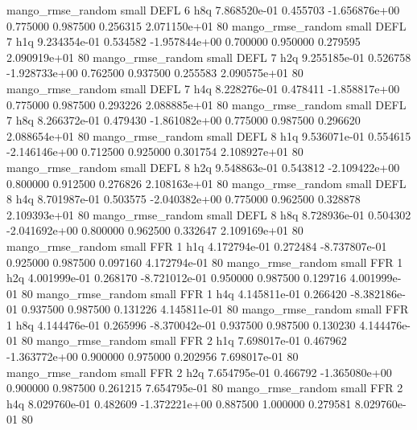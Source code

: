 mango_rmse_random      small     DEFL                 6                  h8q 7.868520e-01      0.455703 -1.656876e+00 0.775000 0.987500       0.256315 2.071150e+01 80
mango_rmse_random      small     DEFL                 7                  h1q 9.234354e-01      0.534582 -1.957844e+00 0.700000 0.950000       0.279595 2.090919e+01 80
mango_rmse_random      small     DEFL                 7                  h2q 9.255185e-01      0.526758 -1.928733e+00 0.762500 0.937500       0.255583 2.090575e+01 80
mango_rmse_random      small     DEFL                 7                  h4q 8.228276e-01      0.478411 -1.858817e+00 0.775000 0.987500       0.293226 2.088885e+01 80
mango_rmse_random      small     DEFL                 7                  h8q 8.266372e-01      0.479430 -1.861082e+00 0.775000 0.987500       0.296620 2.088654e+01 80
mango_rmse_random      small     DEFL                 8                  h1q 9.536071e-01      0.554615 -2.146146e+00 0.712500 0.925000       0.301754 2.108927e+01 80
mango_rmse_random      small     DEFL                 8                  h2q 9.548863e-01      0.543812 -2.109422e+00 0.800000 0.912500       0.276826 2.108163e+01 80
mango_rmse_random      small     DEFL                 8                  h4q 8.701987e-01      0.503575 -2.040382e+00 0.775000 0.962500       0.328878 2.109393e+01 80
mango_rmse_random      small     DEFL                 8                  h8q 8.728936e-01      0.504302 -2.041692e+00 0.800000 0.962500       0.332647 2.109169e+01 80
mango_rmse_random      small      FFR                 1                  h1q 4.172794e-01      0.272484 -8.737807e-01 0.925000 0.987500       0.097160 4.172794e-01 80
mango_rmse_random      small      FFR                 1                  h2q 4.001999e-01      0.268170 -8.721012e-01 0.950000 0.987500       0.129716 4.001999e-01 80
mango_rmse_random      small      FFR                 1                  h4q 4.145811e-01      0.266420 -8.382186e-01 0.937500 0.987500       0.131226 4.145811e-01 80
mango_rmse_random      small      FFR                 1                  h8q 4.144476e-01      0.265996 -8.370042e-01 0.937500 0.987500       0.130230 4.144476e-01 80
mango_rmse_random      small      FFR                 2                  h1q 7.698017e-01      0.467962 -1.363772e+00 0.900000 0.975000       0.202956 7.698017e-01 80
mango_rmse_random      small      FFR                 2                  h2q 7.654795e-01      0.466792 -1.365080e+00 0.900000 0.987500       0.261215 7.654795e-01 80
mango_rmse_random      small      FFR                 2                  h4q 8.029760e-01      0.482609 -1.372221e+00 0.887500 1.000000       0.279581 8.029760e-01 80

